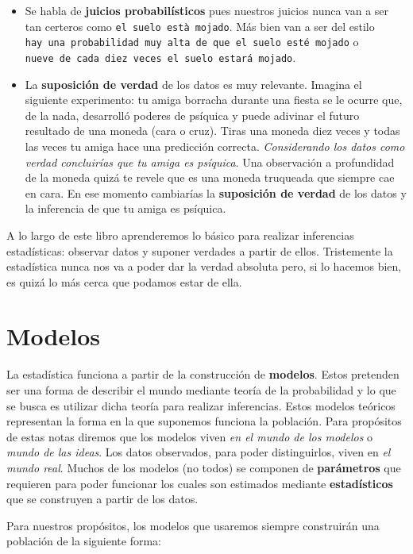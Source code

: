 \documentclass[
]{book}
\begin{document}
\begin{itemize}
\item
  Se habla de \textbf{juicios probabilísticos} pues nuestros juicios nunca van a ser tan certeros como \texttt{el\ suelo\ està\ mojado}. Más bien van a ser del estilo \texttt{hay\ una\ probabilidad\ muy\ alta\ de\ que\ el\ suelo\ esté\ mojado} o \texttt{nueve\ de\ cada\ diez\ veces\ el\ suelo\ estará\ mojado}.
\item
  La \textbf{suposición de verdad} de los datos es muy relevante. Imagina el siguiente experimento: tu amiga borracha durante una fiesta se le ocurre que, de la nada, desarrolló poderes de psíquica y puede adivinar el futuro resultado de una moneda (cara o cruz). Tiras una moneda diez veces y todas las veces tu amiga hace una predicción correcta. \emph{Considerando los datos como verdad concluirías que tu amiga es psíquica}. Una observación a profundidad de la moneda quizá te revele que es una moneda truqueada que siempre cae en cara. En ese momento cambiarías la \textbf{suposición de verdad} de los datos y la inferencia de que tu amiga es psíquica.
\end{itemize}

A lo largo de este libro aprenderemos lo básico para realizar inferencias estadísticas: observar datos y suponer verdades a partir de ellos. Tristemente la estadística nunca nos va a poder dar la verdad absoluta pero, si lo hacemos bien, es quizá lo más cerca que podamos estar de ella.

\hypertarget{modelos}{%
\section{Modelos}\label{modelos}}

La estadística funciona a partir de la construcción de \textbf{modelos}. Estos pretenden ser una forma de describir el mundo mediante teoría de la probabilidad y lo que se busca es utilizar dicha teoría para realizar inferencias. Estos modelos teóricos representan la forma en la que suponemos funciona la población. Para propósitos de estas notas diremos que los modelos viven \emph{en el mundo de los modelos} o \emph{mundo de las ideas}. Los datos observados, para poder distinguirlos, viven en \emph{el mundo real}. Muchos de los modelos (no todos) se componen de \textbf{parámetros} que requieren para poder funcionar los cuales son estimados mediante \textbf{estadísticos} que se construyen a partir de los datos.

Para nuestros propósitos, los modelos que usaremos siempre construirán una población de la siguiente forma:
\end{document}
